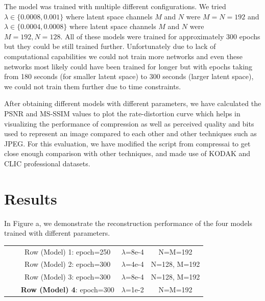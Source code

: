 \documentclass{article}
\begin{document}
The model was trained with multiple different configurations. We tried $\lambda \in \{0.0008, 0.001\}$ where latent space channels $M$ and $N$ were $M=N=192$ and $\lambda \in \{0.0004, 0.0008\}$ where latent space channels $M$ and $N$ were $M=192, N=128$.
All of these models were trained for approximately 300 epochs but they could be still trained further.
Unfortunately due to lack of computational capabilities we could not train more networks and even these networks most likely could have been trained for longer but with epochs taking from 180 seconds (for smaller latent space) to 300 seconds (larger latent space), we could not train them further due to time constraints.

After obtaining different models with different parameters, we have calculated the PSNR and MS-SSIM \cite{Bjntegaard2001CalculationOA, WangZhou2003Mssf} values to plot the rate-distortion curve which helps in visualizing the performance of compression as well as perceived quality and bits used to represent an image compared to each other and other techniques such as JPEG. For this evaluation, we have modified the script from compressai \cite{compressai} to get close enough comparison with other techniques, and made use of KODAK\cite{kodak} and CLIC professional \cite{clic} datasets.


\section{Results}
\label{sec:results}

In Figure a, we demonstrate the reconstruction performance of the four models trained with different parameters.

\begin{table}[!h]
\label{table:models}
\begin{center}
\begin{tabular}{c c c}
    Row (Model) 1: epoch=250 & $\lambda$=8e-4 & N=M=192 \\
    Row (Model) 2: epoch=300 & $\lambda$=4e-4 & N=128, M=192 \\
    Row (Model) 3: epoch=300 & $\lambda$=8e-4 & N=128, M=192 \\
    \textbf{Row (Model) 4}: epoch=300 & $\lambda$=1e-2 & N=M=192 \\
\end{tabular}
\end{center}
\end{table}

\vfill
\end{document}
